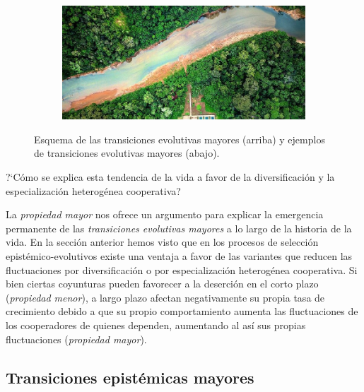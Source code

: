 \documentclass[a4paper,11pt]{book}
\theoremstyle{definition}
\newif\ifen
\newif\ifes
\newcommand{\En}[1]{\ifen#1\fi}
\newcommand{\Es}[1]{\ifes#1\fi}
\begin{document}
\begin{figure}[ht!]
\begin{subfigure}[b]{0.235\textwidth}
 \includegraphics[width=\linewidth]{static/tsimane2.jpg}
  \caption*{\En{Ecosystems}}
 \end{subfigure}
 \caption{
Esquema de las transiciones evolutivas mayores (arriba) y ejemplos de transiciones evolutivas mayores (abajo).
 }
 \label{fig:trans}
 \vspace{-0.3cm}
 \end{figure}
?`C\'omo se explica esta tendencia de la vida a favor de la diversificaci\'on y la especializaci\'on heterog\'enea cooperativa?


La \emph{propiedad mayor} nos ofrece un argumento para explicar la emergencia permanente de las \emph{transiciones evolutivas mayores} a lo largo de la historia de la vida.
%
En la secci\'on anterior hemos visto que en los procesos de selecci\'on epist\'emico-evolutivos existe una ventaja a favor de las variantes que reducen las fluctuaciones por diversificaci\'on o por especializaci\'on heterog\'enea cooperativa.
%
Si bien ciertas coyunturas pueden favorecer a la deserci\'on en el corto plazo (\emph{propiedad menor}), a largo plazo afectan negativamente su propia tasa de crecimiento debido a que su propio comportamiento aumenta las fluctuaciones de los cooperadores de quienes dependen, aumentando al as\'i sus propias fluctuaciones (\emph{propiedad mayor}).


\subsection{Transiciones epist\'emicas mayores}

%
%
%
\end{document}
